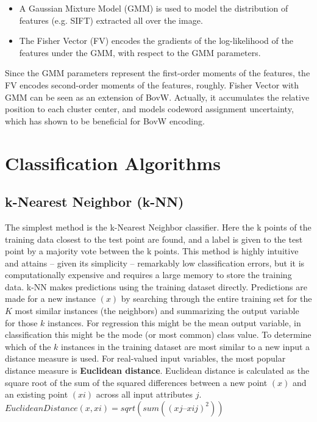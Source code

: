 \documentclass[12pt]{article}
\numberwithin{equation}{section}
\numberwithin{table}{section}
\numberwithin{figure}{section}
\begin{document}
\begin{itemize}
	\item A Gaussian Mixture Model (GMM) is used to model the distribution of features (e.g. SIFT) extracted all over the image.
	\item The Fisher Vector (FV) encodes the gradients of the log-likelihood of the features under the GMM, with respect to the GMM parameters.
\end{itemize}

\noindent
Since the GMM parameters represent the first-order moments of the features, the FV encodes second-order moments of the features, roughly. Fisher Vector with GMM can be seen as an extension of BovW. Actually, it accumulates the relative position to each cluster center, and models codeword assignment uncertainty, which has shown to be beneficial for BovW encoding\cite{Sun2013}.









\section{Classification Algorithms} \label{classalgs}

\subsection{k-Nearest Neighbor (k-NN)} \label{knn}
The simplest method is the k-Nearest Neighbor classifier. Here the k points of the training data closest to the test point are found, and a label is given to the test point by a majority vote between the k points. This method is highly intuitive and attains – given its simplicity – remarkably low classification errors, but it is computationally expensive and requires a large memory to store the training data. k-NN makes predictions using the training dataset directly. Predictions are made for a new instance $(x)$ by searching through the entire training set for the $K$ most similar instances (the neighbors) and summarizing the output variable for those $k$ instances. For regression this might be the mean output variable, in classification this might be the mode (or most common) class value. To determine which of the $k$ instances in the training dataset are most similar to a new input a distance measure is used. For real-valued input variables, the most popular distance measure is \textbf{Euclidean distance}. Euclidean distance is calculated as the square root of the sum of the squared differences between a new point $(x)$ and an existing point $(xi)$ across all input attributes $j$.
$EuclideanDistance(x, xi) = sqrt( sum( (xj – xij)^2 ) )$
\end{document}
